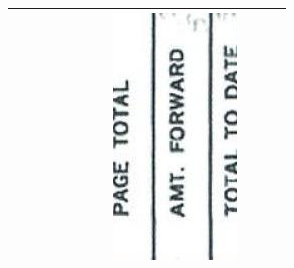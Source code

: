 \documentclass[10pt]{article}
\begin{document}
\begin{center}
\begin{tabular}{|c|c|c|c|c|c|c|c|c|c|c|}
 &  &  &  &  &  &  & \includegraphics[max width=\textwidth]{2025_02_27_dd68c3d38de88f0516d9g-006}
 &  &  &  \\
\hline
\end{tabular}
\end{center}
\end{document}
